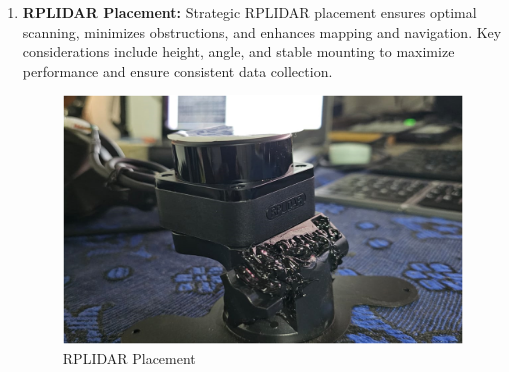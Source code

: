{\begin{enumerate}[label=\textbf{\arabic*}., leftmargin=*]
        \item \textbf{RPLIDAR Placement:} Strategic RPLIDAR placement ensures optimal scanning, minimizes obstructions, and enhances mapping and navigation. Key considerations include height, angle, and stable mounting to maximize performance and ensure consistent data collection.
		
		\begin{figure}[H]
			\centering
			\includegraphics[scale=0.4]{images/Content/RPLIDAR_PLACEMENT.png}
			\caption{RPLIDAR Placement}
		\end{figure}
	\end{enumerate}
}
